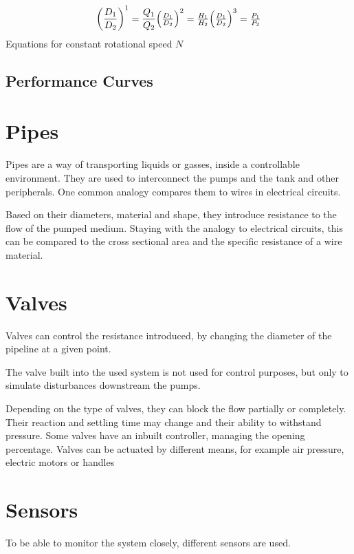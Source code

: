\begin{equation}
	\left(\frac{D_1}{D_2}\right)^1 = \frac{Q_1}{Q_2}$$
	
	$$\left(\frac{D_1}{D_2}\right)^2 = \frac{H_1}{H_2}$$
	
	$$\left(\frac{D_1}{D_2}\right)^3 = \frac{P_1}{P_2}	
\end{equation} Equations for constant rotational speed $N$ \cite{AffinityLaws}


\subsection{Performance Curves}

\section{Pipes}
Pipes are a way of transporting liquids or gasses, inside a controllable environment.
They are used to interconnect the pumps and the tank and other peripherals.
One common analogy compares them to wires in electrical circuits.

Based on their diameters, material and shape,
they introduce resistance to the flow of the pumped medium.
Staying with the analogy to electrical circuits,
this can be compared to the cross sectional area and the specific resistance of a wire material.

\section{Valves}
Valves can control the resistance introduced, by changing the diameter of the pipeline at a given point. 

The valve built into the used system is not used for control purposes,
but only to simulate disturbances downstream the pumps.

Depending on the type of valves, they can block the flow partially or completely.
Their reaction and settling time may change and their ability to withstand pressure.
Some valves have an inbuilt controller, managing the opening percentage.
Valves can be actuated by different means, for example air pressure, electric motors or handles

\section{Sensors}
To be able to monitor the system closely, different sensors are used.


